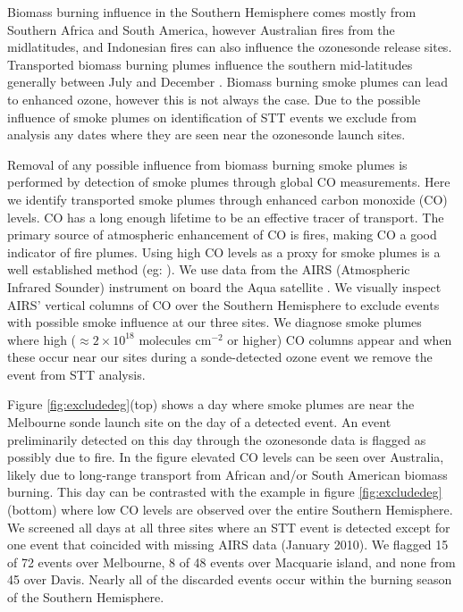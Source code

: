 \documentclass{article}
\begin{document}
    Biomass burning influence in the Southern Hemisphere comes mostly from Southern Africa and South America, however Australian fires from the midlatitudes, and Indonesian fires can also influence the ozonesonde release sites.
    Transported biomass burning plumes influence the southern mid-latitudes generally between July and December \citep{Pak2003}.
    Biomass burning smoke plumes can lead to enhanced ozone, however this is not always the case.
    Due to the possible influence of smoke plumes on identification of STT events we exclude from analysis any dates where they are seen near the ozonesonde launch sites.
    
    Removal of any possible influence from biomass burning smoke plumes is performed by detection of smoke plumes through global CO measurements.
    Here we identify transported smoke plumes through enhanced carbon monoxide (CO) levels.
    CO has a long enough lifetime to be an effective tracer of transport.
    The primary source of atmospheric enhancement of CO is fires, making CO a good indicator of fire plumes.
    Using high CO levels as a proxy for smoke plumes is a well established method (eg: \citet{Edwards2003,Sinha2004,Edwards2006,Mari2008}).
    We use data from the AIRS (Atmospheric Infrared Sounder) instrument on board the Aqua satellite \citep{AIRS3STD}.
    We visually inspect AIRS' vertical columns of CO over the Southern Hemisphere to exclude events with possible smoke influence at our three sites.
    We diagnose smoke plumes where high ($\approx 2 \times 10^{18}$ molecules cm$^{-2}$ or higher) CO columns appear and when these occur near our sites during a sonde-detected ozone event we remove the event from STT analysis.

    Figure \ref{fig:excludedeg}(top) shows a day where smoke plumes are near the Melbourne sonde launch site on the day of a detected event. 
    An event preliminarily detected on this day through the ozonesonde data is flagged as possibly due to fire.
    In the figure elevated CO levels can be seen over Australia, likely due to long-range transport from African and/or South American biomass burning.
    This day can be contrasted with the example in figure \ref{fig:excludedeg}(bottom) where low CO levels are observed over the entire Southern Hemisphere.
    We screened all days at all three sites where an STT event is detected except for one event that coincided with missing AIRS data (January 2010). 
    We flagged 15 of 72 events over Melbourne, 8 of 48 events over Macquarie island, and none from 45 over Davis.
    Nearly all of the discarded events occur within the burning season of the Southern Hemisphere.
    
\end{document}
